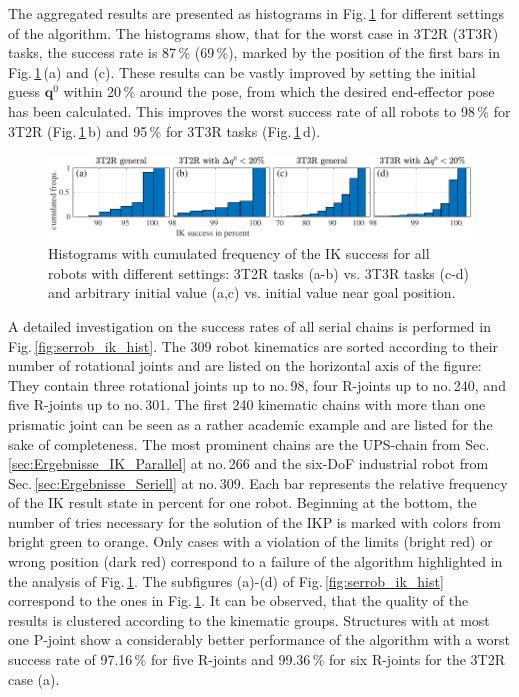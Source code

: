 \documentclass[robotics,article,submit,moreauthors,pdftex]{Definitions/mdpi}
\newcommand{\bm}[1]{\boldsymbol{#1}}
\begin{document}
The aggregated results are presented as histograms in Fig.\,\ref{fig:serrob_ik_hist_cdf} for different settings of the algorithm.
The histograms show, that for the worst case in 3T2R (3T3R) tasks, the success rate is 87\,\% (69\,\%), marked by the position of the first bars in Fig.\,\ref{fig:serrob_ik_hist_cdf}\,(a) and (c).
These results can be vastly improved by setting the initial guess $\bm{q}^0$ within 20\,\% around the pose, from which the desired end-effector pose has been calculated.
This improves the worst success rate of all robots to 98\,\% for 3T2R (Fig.\,\ref{fig:serrob_ik_hist_cdf}\,b) and 95\,\% for 3T3R tasks (Fig.\,\ref{fig:serrob_ik_hist_cdf}\,d).


%
\begin{figure}[tb]
    \includegraphics{serrob_ik_hist_cdf_all.pdf}
    \caption{Histograms with cumulated frequency of the IK success for all robots with different settings: 3T2R tasks (a-b) vs. 3T3R tasks (c-d) and arbitrary initial value (a,c) vs. initial value near goal position.}
    \label{fig:serrob_ik_hist_cdf}
\end{figure} 
%

A detailed investigation on the success rates of all serial chains is performed in Fig.\,\ref{fig:serrob_ik_hist}.
The 309 robot kinematics are sorted according to their number of rotational joints and are listed on the horizontal axis of the figure: They contain three rotational joints up to no.\,98, four R-joints up to no.\,240, and five R-joints up to no.\,301.
The first 240 kinematic chains with more than one prismatic joint can be seen as a rather academic example and are listed for the sake of completeness.
The most prominent chains are the UPS-chain from Sec.\,\ref{sec:Ergebnisse_IK_Parallel} at no.\,266 and the six-DoF industrial robot from Sec.\,\ref{sec:Ergebnisse_Seriell} at no.\,309.
Each bar represents the relative frequency of the IK result state in percent for one robot. 
Beginning at the bottom, the number of tries necessary for the solution of the IKP is marked with colors from bright green to orange.
Only cases with a violation of the limits (bright red) or wrong position (dark red) correspond to a failure of the algorithm highlighted in the analysis of Fig.\,\ref{fig:serrob_ik_hist_cdf}.
The subfigures (a)-(d) of Fig.\,\ref{fig:serrob_ik_hist} correspond to the ones in Fig.\,\ref{fig:serrob_ik_hist_cdf}.
It can be observed, that the quality of the results is clustered according to the kinematic groups.
Structures with at most one P-joint show a considerably better performance of the algorithm with a worst success rate of 97.16\,\% for five R-joints %
and 99.36\,\% for six R-joints %
for the 3T2R case (a).
\end{document}
